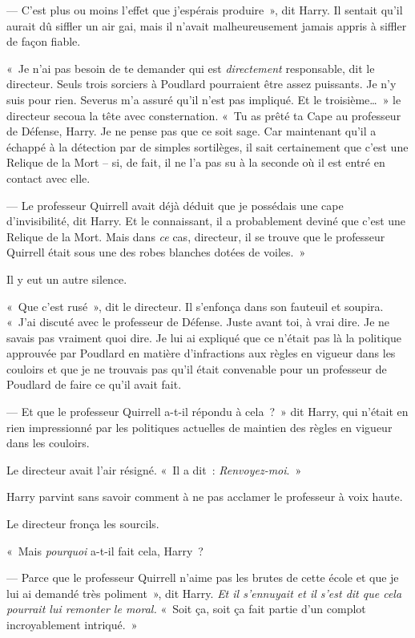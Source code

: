 --- C'est plus ou moins l'effet que j'espérais produire~», dit Harry. Il sentait qu'il aurait dû siffler un air gai, mais il n'avait malheureusement jamais appris à siffler de façon fiable.

«~Je n'ai pas besoin de te demander qui est \emph{directement} responsable, dit le directeur. Seuls trois sorciers à Poudlard pourraient être assez puissants. Je n'y suis pour rien. Severus m'a assuré qu'il n'est pas impliqué. Et le troisième…~» le directeur secoua la tête avec consternation. «~Tu as prêté ta Cape au professeur de Défense, Harry. Je ne pense pas que ce soit sage. Car maintenant qu'il a échappé à la détection par de simples sortilèges, il sait certainement que c'est une Relique de la Mort -- si, de fait, il ne l'a pas su à la seconde où il est entré en contact avec elle.

--- Le professeur Quirrell avait déjà déduit que je possédais une cape d'invisibilité, dit Harry. Et le connaissant, il a probablement deviné que c'est une Relique de la Mort. Mais dans \emph{ce} cas, directeur, il se trouve que le professeur Quirrell était sous une des robes blanches dotées de voiles.~»

Il y eut un autre silence.

«~Que c'est rusé~», dit le directeur. Il s'enfonça dans son fauteuil et soupira. «~J'ai discuté avec le professeur de Défense. Juste avant toi, à vrai dire. Je ne savais pas vraiment quoi dire. Je lui ai expliqué que ce n'était pas là la politique approuvée par Poudlard en matière d'infractions aux règles en vigueur dans les couloirs et que je ne trouvais pas qu'il était convenable pour un professeur de Poudlard de faire ce qu'il avait fait.

--- Et que le professeur Quirrell a-t-il répondu à cela~?~» dit Harry, qui n'était en rien impressionné par les politiques actuelles de maintien des règles en vigueur dans les couloirs.

Le directeur avait l'air résigné. «~Il a dit~: \emph{Renvoyez-moi}.~»

Harry parvint sans savoir comment à ne pas acclamer le professeur à voix haute.

Le directeur fronça les sourcils.

«~Mais \emph{pourquoi} a-t-il fait cela, Harry~?

--- Parce que le professeur Quirrell n'aime pas les brutes de cette école et que je lui ai demandé très poliment~», dit Harry. \emph{Et il s'ennuyait et il s'est dit que cela pourrait lui remonter le moral.} «~Soit ça, soit ça fait partie d'un complot incroyablement intriqué.~»

